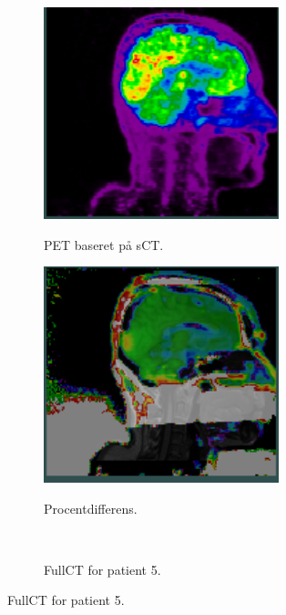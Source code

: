 \begin{figure}
\begin{subfigure}[b]{0.3\textwidth}
        \label{col:loocv_pet_pat4_ct}
    \end{subfigure}\hfill
    \begin{subfigure}[b]{0.3\textwidth}
        \caption{PET baseret på sCT.}
        \includegraphics[width=0.75\textwidth]{colager/loocv_pet/loocv_010960_pet_sct.png}
        \label{col:loocv_pet_pat4_sct}
    \end{subfigure}\hfill
    \begin{subfigure}[b]{0.3\textwidth}
        \caption{Procentdifferens.}
        \includegraphics[width=0.75\textwidth]{colager/loocv_pet/loocv_010960_pet_pd.png}
        \label{col:loocv_pet_pat4_pd}
    \end{subfigure}\\
    \begin{subfigure}[b]{0.3\textwidth}
        \caption{FullCT for patient 5.}

\end{subfigure}
\end{figure}

